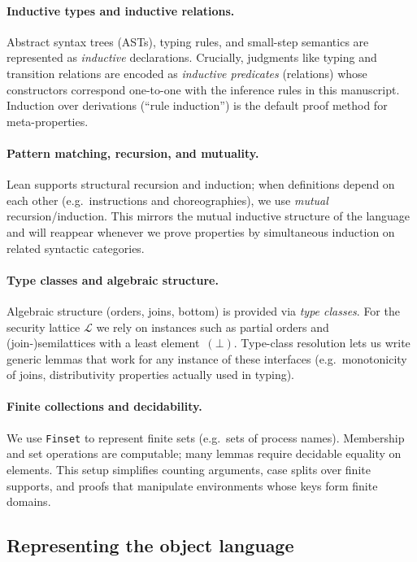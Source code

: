 \documentclass[12pt,a4paper,twoside]{book}
\newcommand{\MCL}{\mathscr{L}}
\begin{document}
\paragraph{Inductive types and inductive relations.}
Abstract syntax trees (ASTs), typing rules, and small-step semantics are represented as \emph{inductive} declarations.
Crucially, judgments like typing and transition relations are encoded as \emph{inductive predicates} (relations) whose constructors correspond one-to-one with the inference rules in this manuscript.
Induction over derivations (``rule induction'') is the default proof method for meta-properties.

\paragraph{Pattern matching, recursion, and mutuality.}
Lean supports structural recursion and induction; when definitions depend on each other (e.g.\ instructions and choreographies), we use \emph{mutual} recursion/induction.
This mirrors the mutual inductive structure of the language and will reappear whenever we prove properties by simultaneous induction on related syntactic categories.

\paragraph{Type classes and algebraic structure.}
Algebraic structure (orders, joins, bottom) is provided via \emph{type classes}.
For the security lattice \(\MCL\) we rely on instances such as partial orders and (join-)semilattices with a least element~\((\bot)\).
Type-class resolution lets us write generic lemmas that work for any instance of these interfaces (e.g.\ monotonicity of joins, distributivity properties actually used in typing).

\paragraph{Finite collections and decidability.}
We use \texttt{Finset} to represent finite sets (e.g.\ sets of process names).
Membership and set operations are computable; many lemmas require decidable equality on elements.
This setup simplifies counting arguments, case splits over finite supports, and proofs that manipulate environments whose keys form finite domains.

\subsection{Representing the object language}
\end{document}
